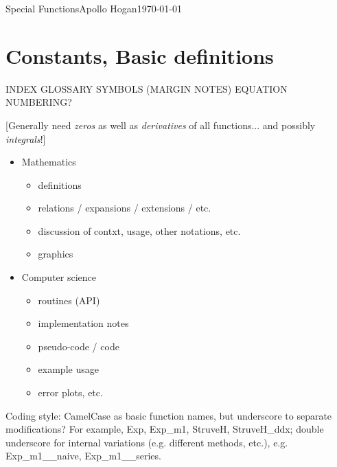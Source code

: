 \documentclass[10pt,dvipdfmx,letterpaper,twoside]{article}
\let\O=\operatorname
\begin{document}
{\LARGE Special Functions}\hfill Apollo Hogan\hfill\today

\tableofcontents

\section{Constants, Basic definitions}

INDEX
GLOSSARY
SYMBOLS
(MARGIN NOTES)
EQUATION NUMBERING?

[Generally need {\em zeros} as well as {\em derivatives} of all functions... and possibly {\em integrals}!]

\begin{itemize}
\item Mathematics
  \begin{itemize}
  \item definitions
  \item relations / expansions / extensions / etc.
  \item discussion of contxt, usage, other notations, etc.
  \item graphics
  \end{itemize}
\item Computer science
  \begin{itemize}
  \item routines (API)
  \item implementation notes
  \item pseudo-code / code
  \item example usage
  \item error plots, etc.
  \end{itemize}
\end{itemize}
Coding style: CamelCase as basic function names, but underscore to separate modifications?
For example, Exp, Exp\_m1, StruveH, StruveH\_ddx; double underscore for internal variations
(e.g. different methods, etc.), e.g. Exp\_m1\_\_naive, Exp\_m1\_\_series.

\end{document}

